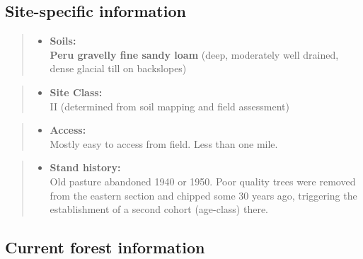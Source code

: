 \documentclass[]{tufte-handout}
\providecommand{\tightlist}{%
  \setlength{\itemsep}{0pt}\setlength{\parskip}{0pt}}
\begin{document}
\subsection{Site-specific information}\label{site-specific-information}

\begin{quote}
\begin{itemize}
\tightlist
\item
  \textbf{Soils:}\\
  \indent\indent  \textbf{Peru gravelly fine sandy loam} (deep,
  moderately well drained, dense glacial till on backslopes)
\end{itemize}
\end{quote}

\begin{quote}
\begin{itemize}
\tightlist
\item
  \textbf{Site Class:}\\
  \vspace{2pt} II (determined from soil mapping and field assessment)
\end{itemize}
\end{quote}

\begin{quote}
\begin{itemize}
\tightlist
\item
  \textbf{Access:}\\
  \vspace{2pt} Mostly easy to access from field. Less than one mile.
\end{itemize}
\end{quote}

\begin{quote}
\begin{itemize}
\tightlist
\item
  \textbf{Stand history:}\\
  \vspace{2pt} Old pasture abandoned 1940 or 1950. Poor quality trees
  were removed from the eastern section and chipped some 30 years ago,
  triggering the establishment of a second cohort (age-class) there.
\end{itemize}
\end{quote}

\subsection{Current forest
information}\label{current-forest-information}
\end{document}
